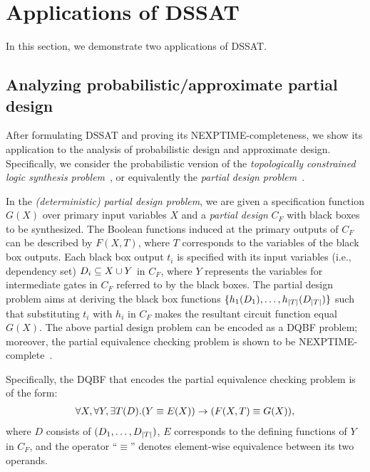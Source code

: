 \section{Applications of DSSAT}
\label{sect:dssat-application}

In this section, we demonstrate two applications of DSSAT.

\subsection{Analyzing probabilistic/approximate partial design}
After formulating DSSAT and proving its NEXPTIME-completeness,
we show its application to the analysis of probabilistic design and approximate design.
Specifically, we consider the probabilistic version of the \textit{topologically constrained logic synthesis problem}~\cite{Sinha2002,Balabanov2014},
or equivalently the \textit{partial design problem}~\cite{Gitina2013}.

In the \textit{(deterministic) partial design problem},
we are given a specification function $G(X)$ over primary input variables $X$ and
a \textit{partial design} $C_F$ with black boxes to be synthesized.
The Boolean functions induced at the primary outputs of $C_F$ can be described by $F(X,T)$,
where $T$ corresponds to the variables of the black box outputs.
Each black box output $t_i$ is specified with its input variables (i.e., dependency set) $D_{i}\subseteq X \cup Y$ in $C_F$,
where $Y$ represents the variables for intermediate gates in $C_F$ referred to by the black boxes.
The partial design problem aims at deriving the black box functions $\{h_1(D_{1}),\ldots,h_{|T|}(D_{|T|})\}$
such that substituting $t_i$ with $h_i$ in $C_F$ makes the resultant circuit function equal $G(X)$.
The above partial design problem can be encoded as a DQBF problem;
moreover, the partial equivalence checking problem is shown to be NEXPTIME-complete~\cite{Gitina2013}.

Specifically, the DQBF that encodes the partial equivalence checking problem is of the form:
\begin{align}
    \label{eq:dssat-dqbf-partial-design}
    \forall X,\forall Y,\exists T(D).(Y \equiv E(X)) \rightarrow (F(X,T)\equiv G(X)),
\end{align}
where $D$ consists of $(D_{1},\ldots,D_{|T|})$,
$E$ corresponds to the defining functions of $Y$ in $C_F$,
and the operator ``$\equiv$'' denotes element-wise equivalence between its two operands.

